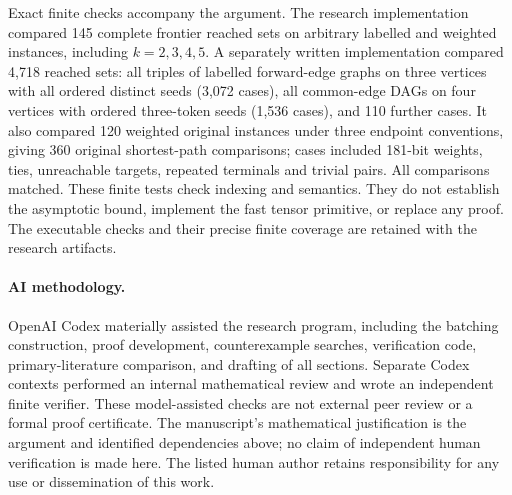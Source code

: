 \documentclass[acmlarge,11pt,screen,nonacm]{acmart}
\begin{document}
Exact finite checks accompany the argument. The research implementation
compared 145 complete frontier reached sets on arbitrary labelled and weighted
instances, including $k=2,3,4,5$. A separately written implementation compared
4,718 reached sets: all triples of labelled forward-edge graphs on three
vertices with all ordered distinct seeds (3,072 cases), all common-edge DAGs
on four vertices with ordered three-token seeds (1,536 cases), and 110 further
cases. It also compared 120 weighted original instances under three endpoint
conventions, giving 360 original shortest-path comparisons; cases included
181-bit weights, ties, unreachable targets, repeated terminals and trivial
pairs. All comparisons matched. These finite tests check indexing and
semantics. They do not establish the asymptotic bound, implement the fast
tensor primitive, or replace any proof. The executable checks and their
precise finite coverage are retained with the research artifacts.

\paragraph{AI methodology.}
OpenAI Codex materially assisted the research program, including the
batching construction, proof development, counterexample searches,
verification code, primary-literature comparison, and drafting of all
sections. Separate Codex contexts performed an internal mathematical review
and wrote an independent finite verifier. These model-assisted checks are
not external peer review or a formal proof certificate. The manuscript's
mathematical justification is the argument and identified dependencies above;
no claim of independent human verification is made here. The listed human
author retains responsibility for any use or dissemination of this work.

\clearpage


\end{document}
